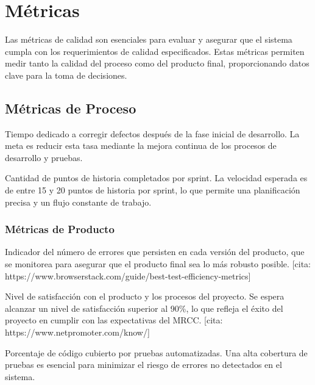 \section{Métricas}\label{sec:metricas}

Las métricas de calidad son esenciales para evaluar y asegurar que el sistema cumpla con los requerimientos de calidad especificados. 
Estas métricas permiten medir tanto la calidad del proceso como del producto final, proporcionando datos clave para la toma de decisiones.

\subsection{Métricas de Proceso}
Tiempo dedicado a corregir defectos después de la fase inicial de desarrollo. La meta es reducir esta tasa mediante la mejora continua 
de los procesos de desarrollo y pruebas.

Cantidad de puntos de historia completados por sprint. La velocidad esperada es de entre 15 y 20 puntos de historia por sprint, lo que
permite una planificación precisa y un flujo constante de trabajo.

\subsubsection{Métricas de Producto}
Indicador del número de errores que persisten en cada versión del producto, que se monitorea para asegurar que el producto final sea 
lo más robusto posible.
[cita: https://www.browserstack.com/guide/best-test-efficiency-metrics]

Nivel de satisfacción con el producto y los procesos del proyecto. Se espera alcanzar un nivel de satisfacción superior al 90\%, 
lo que refleja el éxito del proyecto en cumplir con las expectativas del MRCC.
[cita: https://www.netpromoter.com/know/]

Porcentaje de código cubierto por pruebas automatizadas. Una alta cobertura de pruebas es esencial para minimizar el riesgo de errores 
no detectados en el sistema.
